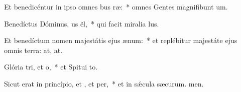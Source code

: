 \item Et benedicéntur in ipso omnes bus ræ:~* omnes Gentes magnifibunt um.
\item Benedíctus Dóminus, us ël,~* qui facit miralia lus.
\item Et benedíctum nomen majestátis ejus  ænum:~* et replébitur majestáte ejus omnis terra: at, at.
\item Glória tri, et o,~* et Spitui to.
\item Sicut erat in princípio, et , et per,~* et in sǽcula sæcurum. men.
